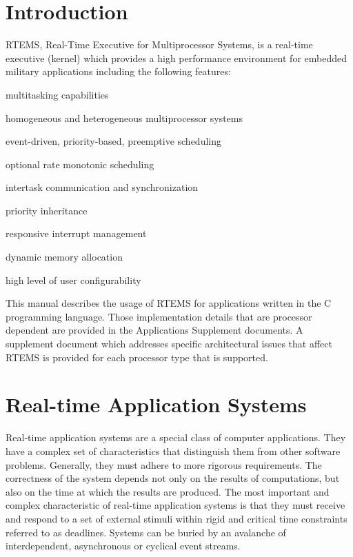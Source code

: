 \hypertarget{RTEMSOverview_RTEMSOverviewSecIntroduction}{}\section{Introduction}\label{RTEMSOverview_RTEMSOverviewSecIntroduction}
R\+T\+E\+MS, Real-\/\+Time Executive for Multiprocessor Systems, is a real-\/time executive (kernel) which provides a high performance environment for embedded military applications including the following features\+:


\begin{DoxyItemize}
\item multitasking capabilities
\item homogeneous and heterogeneous multiprocessor systems
\item event-\/driven, priority-\/based, preemptive scheduling
\item optional rate monotonic scheduling
\item intertask communication and synchronization
\item priority inheritance
\item responsive interrupt management
\item dynamic memory allocation
\item high level of user configurability
\end{DoxyItemize}

This manual describes the usage of R\+T\+E\+MS for applications written in the C programming language. Those implementation details that are processor dependent are provided in the Applications Supplement documents. A supplement document which addresses specific architectural issues that affect R\+T\+E\+MS is provided for each processor type that is supported.\hypertarget{RTEMSOverview_RTEMSOverviewSecRealtimeApplicationSystems}{}\section{Real-\/time Application Systems}\label{RTEMSOverview_RTEMSOverviewSecRealtimeApplicationSystems}
Real-\/time application systems are a special class of computer applications. They have a complex set of characteristics that distinguish them from other software problems. Generally, they must adhere to more rigorous requirements. The correctness of the system depends not only on the results of computations, but also on the time at which the results are produced. The most important and complex characteristic of real-\/time application systems is that they must receive and respond to a set of external stimuli within rigid and critical time constraints referred to as deadlines. Systems can be buried by an avalanche of interdependent, asynchronous or cyclical event streams.


